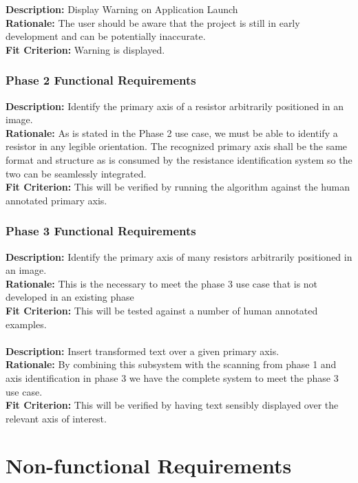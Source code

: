 \documentclass{article}
\begin{document}
\noindent
\textbf{Description: } Display Warning on Application Launch
\\ \textbf{Rationale: } The user should be aware that the project is still in early development and can be potentially inaccurate.
\\ \textbf{Fit Criterion:} Warning is displayed.

\subsubsection{Phase 2 Functional Requirements}

\textbf{Description:} Identify the primary axis of a resistor arbitrarily positioned in an image. 
\\ \textbf{Rationale:} As is stated in the Phase 2 use case, we must be able to identify a resistor in any legible orientation.
The recognized primary axis shall be the same format and structure as is consumed by the resistance identification system so the two can be seamlessly integrated.
\\ \textbf{Fit Criterion: } This will be verified by running the algorithm against the human annotated primary axis.

\subsubsection{Phase 3 Functional Requirements}

\textbf{Description: } Identify the primary axis of many resistors arbitrarily positioned in an image. 
\\ \textbf{Rationale: } This is the necessary to meet the phase 3 use case that is not developed in an existing phase 
\\ \textbf{Fit Criterion: } This will be tested against a number of human annotated examples.
\\ \\
\textbf{Description: } Insert transformed text over a given primary axis.
\\ \textbf{Rationale: } By combining this subsystem with the scanning from phase 1 and axis identification in phase 3 we have the complete system to meet the phase 3 use case.
\\ \textbf{Fit Criterion: } This will be verified by having text sensibly displayed over the relevant axis of interest.


\section{Non-functional Requirements}
\end{document}

